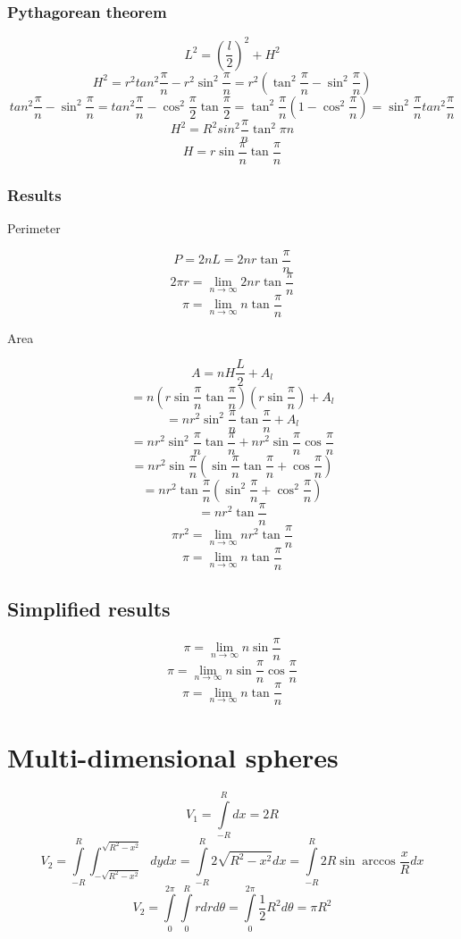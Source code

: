 \documentclass{article}
\begin{document}
\subsubsection{Pythagorean theorem}

$$L^2 = \left(\frac{l}{2}\right)^2 + H^2$$
$$H^2 = r^2tan^2\frac{\pi}{n} - r^2\sin^2\frac{\pi}{n}
= r^2\left(\tan^2\frac{\pi}{n} - \sin^2\frac{\pi}{n}\right)$$
$$tan^2\frac{\pi}{n} - \sin^2\frac{\pi}{n} = tan^2\frac{\pi}{n} - \cos^2\frac{\pi}{2}\tan\frac{\pi}{2}
= \tan^2\frac{\pi}{n}\left(1 - \cos^2\frac{\pi}{n}\right)
= \sin^2\frac{\pi}{n}tan^2\frac{\pi}{n}$$
$$H^2 = R^2sin^2\frac{\pi}{n}\tan^2{\pi}{n}$$
$$H = r\sin\frac{\pi}{n}\tan\frac{\pi}{n}$$

\subsubsection{Results}

Perimeter

$$P = 2nL = 2nr\tan\frac{\pi}{n}$$
$$2\pi{r} = \lim_{n\to\infty} 2nr\tan\frac{\pi}{n}$$
$$\pi = \lim_{n\to\infty} n\tan\frac{\pi}{n}$$

Area

$$A = nH\frac{L}{2} + A_l$$
$$  = n\left(r\sin\frac{\pi}{n}\tan\frac{\pi}{n}\right)\left(r\sin\frac{\pi}{n}\right) + A_l$$
$$  = nr^2\sin^2\frac{\pi}{n}\tan\frac{\pi}{n} + A_l$$
$$  = nr^2\sin^2\frac{\pi}{n}\tan\frac{\pi}{n} + nr^2\sin\frac{\pi}{n}\cos\frac{\pi}{n}$$
$$  = nr^2\sin\frac{\pi}{n}\left(\sin\frac{\pi}{n}\tan\frac{\pi}{n} + \cos\frac{\pi}{n}\right)$$
$$  = nr^2\tan\frac{\pi}{n}\left(\sin^2\frac{\pi}{n} + \cos^2\frac{\pi}{n}\right)$$
$$  = nr^2\tan\frac{\pi}{n}$$
$$\pi{r^2} = \lim_{n\to\infty} nr^2\tan\frac{\pi}{n}$$
$$\pi = \lim_{n\to\infty} n\tan\frac{\pi}{n}$$

\subsection{Simplified results}

$$\pi = \lim_{n\to\infty} n\sin\frac{\pi}{n}$$
$$\pi = \lim_{n\to\infty} n\sin\frac{\pi}{n}\cos\frac{\pi}{n}$$
$$\pi = \lim_{n\to\infty} n\tan\frac{\pi}{n}$$

\section{Multi-dimensional spheres}

$$V_1 = \int\limits_{-R}^{R} dx = 2R$$
$$V_2
= \int\limits_{-R}^{R} \int_{-\sqrt{R^2-x^2}}^{\sqrt{R^2-x^2}} dydx
= \int\limits_{-R}^{R} 2\sqrt{R^2-x^2} dx
= \int\limits_{-R}^{R} 2R\sin\arccos\frac{x}{R} dx$$
$$V_2
= \int\limits_0^{2\pi} \int\limits_0^{R} r drd\theta
= \int\limits_0^{2\pi} \frac{1}{2}R^2 d\theta
= \pi R^2$$
\end{document}

